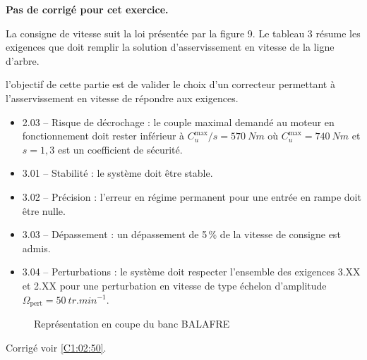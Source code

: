 \normalfalse \difficiletrue \tdifficilefalse
\correctionfalse



\setcounter{question}{0}
\ifcorrection
\else
\textbf{Pas de corrigé pour cet exercice.}
\fi

\ifprof
\else

La consigne de vitesse suit la loi présentée par la figure 9.
Le tableau 3 résume les exigences que doit remplir la solution d’asservissement en vitesse
de la ligne d’arbre.


\begin{obj}
l’objectif de cette partie est de valider le choix d’un correcteur permettant à
l’asservissement en vitesse de répondre aux exigences.
\end{obj}

\begin{itemize}
\item 2.03 -- Risque de décrochage : le couple maximal demandé au moteur en fonctionnement doit
rester inférieur à $C^{\text{max}}_u /s = \SI{570}{Nm}$ où $C^{\text{max}}_u = \SI{740}{Nm}$ et
$s = 1,3$ est un coefficient de sécurité.
\item 3.01 -- Stabilité : le système doit être stable.
\item 3.02 -- Précision : l’erreur en régime permanent pour une entrée en rampe doit
être nulle.
\item 3.03 -- Dépassement : un dépassement de 5\,\% de la vitesse de consigne est admis.
\item 3.04 -- Perturbations : le système doit respecter l’ensemble des exigences 3.XX et
2.XX pour une perturbation en vitesse de type échelon d’amplitude $\Omega_{\text{pert}} = \SI{50}{tr.min^{-1}}$.
\end{itemize}

 
\begin{figure}[H]
\centering
\caption{Représentation en coupe du banc BALAFRE \label{fig_50_01}}
\end{figure}
\fi








\ifprof
\else
\begin{flushright}
\footnotesize{Corrigé  voir \ref{C1:02:50}.}
\end{flushright}%
\fi